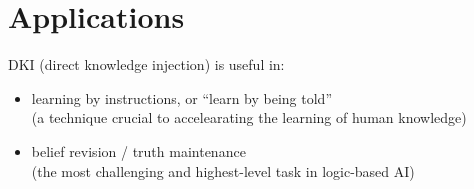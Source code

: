 \documentclass[orivec]{llncs}
\newcommand{\cc}[2]{#1}
\newcommand{\cc}[2]{#2}
\begin{document}

\section{Applications}

DKI (direct knowledge injection) is useful in:
\begin{itemize}
	\item learning by instructions, or ``learn by being told'' \\
	(a technique crucial to accelearating the learning of human knowledge)
	\item belief revision / truth maintenance \\
	(the most challenging and highest-level task in logic-based AI)
\end{itemize}
\end{document}
